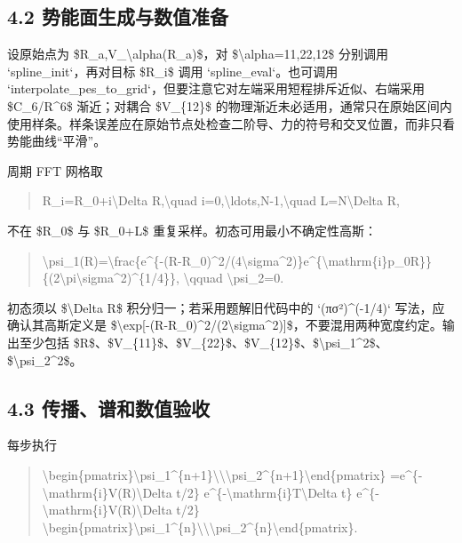 \documentclass[UTF8,openany,11pt,fontset=fandol]{ctexbook}
\begin{document}
\subsection{\texorpdfstring{\textbf{4.2
势能面生成与数值准备}}{4.2 势能面生成与数值准备}}\label{ux52bfux80fdux9762ux751fux6210ux4e0eux6570ux503cux51c6ux5907}

设原始点为 \$R\_a,V\_\textbackslash alpha(R\_a)\$，对
\$\textbackslash alpha=11,22,12\$ 分别调用 `spline\_init`，再对目标
\$R\_i\$ 调用 `spline\_eval`。也可调用
`interpolate\_pes\_to\_grid`，但要注意它对左端采用短程排斥近似、右端采用
\$C\_6/R\^{}6\$ 渐近；对耦合 \$V\_\{12\}\$
的物理渐近未必适用，通常只在原始区间内使用样条。样条误差应在原始节点处检查二阶导、力的符号和交叉位置，而非只看势能曲线``平滑''。

周期 FFT 网格取

\begin{quote}
R\_i=R\_0+i\textbackslash Delta R,\textbackslash quad
i=0,\textbackslash ldots,N-1,\textbackslash quad L=N\textbackslash Delta
R,
\end{quote}

不在 \$R\_0\$ 与 \$R\_0+L\$ 重复采样。初态可用最小不确定性高斯：

\begin{quote}
\textbackslash psi\_1(R)=\textbackslash frac\{e\^{}\{-(R-R\_0)\^{}2/(4\textbackslash sigma\^{}2)\}e\^{}\{\textbackslash mathrm\{i\}p\_0R\}\}
\{(2\textbackslash pi\textbackslash sigma\^{}2)\^{}\{1/4\}\},
\textbackslash qquad \textbackslash psi\_2=0.
\end{quote}

初态须以 \$\textbackslash Delta R\$ 积分归一；若采用题解旧代码中的
`(πσ²)\^{}(-1/4)` 写法，应确认其高斯定义是
\$\textbackslash exp{[}-(R-R\_0)\^{}2/(2\textbackslash sigma\^{}2){]}\$，不要混用两种宽度约定。输出至少包括
\$R\$、\$V\_\{11\}\$、\$V\_\{22\}\$、\$V\_\{12\}\$、\$\textbar\textbackslash psi\_1\textbar\^{}2\$、\$\textbar\textbackslash psi\_2\textbar\^{}2\$。

\subsection{\texorpdfstring{\textbf{4.3
传播、谱和数值验收}}{4.3 传播、谱和数值验收}}\label{ux4f20ux64adux8c31ux548cux6570ux503cux9a8cux6536}

每步执行

\begin{quote}
\textbackslash begin\{pmatrix\}\textbackslash psi\_1\^{}\{n+1\}\textbackslash\textbackslash\textbackslash psi\_2\^{}\{n+1\}\textbackslash end\{pmatrix\}
=e\^{}\{-\textbackslash mathrm\{i\}V(R)\textbackslash Delta t/2\}
e\^{}\{-\textbackslash mathrm\{i\}T\textbackslash Delta t\}
e\^{}\{-\textbackslash mathrm\{i\}V(R)\textbackslash Delta t/2\}
\textbackslash begin\{pmatrix\}\textbackslash psi\_1\^{}\{n\}\textbackslash\textbackslash\textbackslash psi\_2\^{}\{n\}\textbackslash end\{pmatrix\}.
\end{quote}
\end{document}
